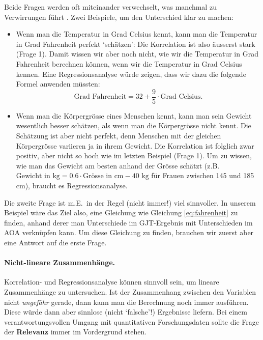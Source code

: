 \documentclass[oneside, 10pt]{book}\usepackage[]{graphicx}\usepackage[]{xcolor}
\begin{document}
Beide Fragen werden oft miteinander verwechselt, was manchmal zu
Verwirrungen führt \citep[siehe][]{Vanhove2013}. Zwei Beispiele, um den
Unterschied klar zu machen:
\begin{itemize}
 \item Wenn man die Temperatur in Grad Celsius kennt, kann man die Temperatur in Grad Fahrenheit perfekt `schätzen':
 Die Korrelation ist also äusserst stark (Frage 1). Damit wissen wir aber noch nicht, wie wir die Temperatur in Grad Fahrenheit berechnen können, wenn wir die Temperatur in Grad Celsius kennen. Eine Regressionsanalyse würde zeigen, dass wir dazu die folgende Formel anwenden müssten:
\begin{equation}\label{eq:fahrenheit}
 \textrm{Grad Fahrenheit} = 32 + \frac{9}{5} \cdot \textrm{Grad Celsius}.
\end{equation}
\item Wenn man die Körpergrösse eines Menschen kennt, kann man
sein Gewicht wesentlich besser schätzen, als wenn man die
Körpergrösse nicht kennt. Die Schätzung ist aber nicht perfekt,
denn Menschen mit der gleichen Körpergrösse variieren ja in ihrem Gewicht.
Die Korrelation ist folglich zwar positiv, aber nicht so hoch wie im letzten
Beispiel (Frage 1). Um zu wissen, wie man das Gewicht am besten
anhand der Grösse schätzt (z.B.\ $\textrm{Gewicht in kg} = 0.6 \cdot \textrm{Grösse in cm} - 40 \textrm{~kg}$ für Frauen zwischen 145 und 185 cm), braucht es Regressionsanalyse.
\end{itemize}

Die zweite Frage ist m.E.\ in der Regel (nicht immer!) viel sinnvoller.
In unserem Beispiel wäre das Ziel also, eine Gleichung
wie Gleichung \ref{eq:fahrenheit} zu finden, anhand derer
man Unterschiede im GJT-Ergebnis mit Unterschieden
im AOA verknüpfen kann. Um diese Gleichung zu finden,
brauchen wir zuerst aber eine Antwort auf die erste Frage.

\paragraph{Nicht-lineare Zusammenhänge.}
Korrelation- und Regressionsanalyse
können sinnvoll sein, um lineare Zusammenhänge zu
untersuchen. Ist der Zusammenhang zwischen
den Variablen nicht \emph{ungefähr} gerade, dann kann
man die Berechnung noch immer ausführen.
Diese würde dann aber sinnlose (nicht `falsche'!) Ergebnisse liefern.
Bei einem verantwortungsvollen Umgang mit quantitativen Forschungsdaten
sollte die Frage der \textbf{Relevanz} immer im Vordergrund stehen.
\end{document}

